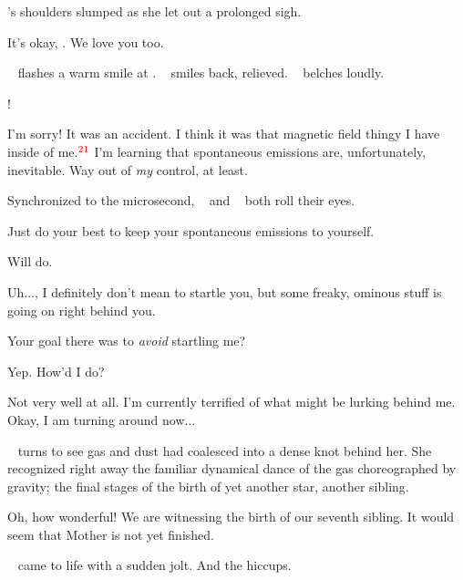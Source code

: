 \documentclass[main.tex]{subfiles}
\begin{document}
\par \nar \rmmaia's shoulders slumped as she let out a prolonged sigh.

\par \Sterope It's okay, \rmmaia.  We love you too.

\par \nar \rmsterope~ flashes a warm smile at \rmmaia.  \rmmaia~ smiles back, relieved.  \rmalcyone~ belches loudly.

\par \Sterope \rmalcyone!

\par \Alcyone I'm sorry!  It was an accident.  I think it was that magnetic field thingy I have inside of me.$^{\textcolor{red}{21}}$  I'm learning that spontaneous emissions are, unfortunately, inevitable.  Way out of \textit{my} control, at least.

\par \nar Synchronized to the microsecond, \rmmaia~ and \rmsterope~ both roll their eyes.

\par \Maia Just do your best to keep your spontaneous emissions to yourself.

\par \Alcyone Will do. 

\par \Electra Uh...\rmmaia, I definitely don't mean to startle you, but some freaky, ominous stuff is going on right behind you.

\par \Maia Your goal there was to \textit{avoid} startling me?

\par \Electra Yep.  How'd I do?

\par \Maia Not very well at all.  I'm currently terrified of what might be lurking behind me.  Okay, I am turning around now...

\par \nar \rmmaia~ turns to see gas and dust had coalesced into a dense knot behind her.  She recognized right away the familiar dynamical dance of the gas choreographed by gravity; the final stages of the birth of yet another star, another sibling.

\par \Maia Oh, how wonderful!  We are witnessing the birth of our seventh sibling.  It would seem that Mother is not yet finished.

\par \nar \rmmerope~ came to life with a sudden jolt.  And the hiccups.  
\end{document}
